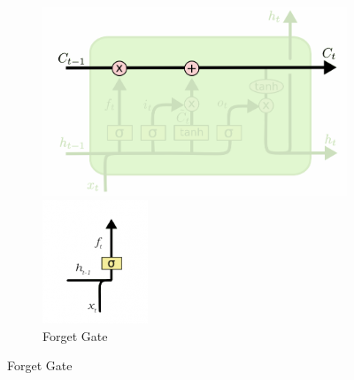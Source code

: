 \documentclass[12 pt]{report}
\begin{document}
\begin{figure}[ht]
\begin{subfigure}{.5\textwidth}
  \centering
  \includegraphics[width=.8\linewidth,frame]{images/memgate.png}  
  \caption{Memory Gate}
  \label{fig:Memory Gate}
  \includegraphics[width=.6\linewidth,frame]{images/forgate.png}  
  \caption{Forget Gate}
  \label{fig:Forget Gate}


\end{subfigure}
\end{figure}
\end{document}
